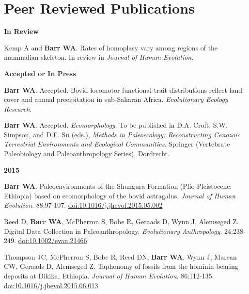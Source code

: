 \documentclass{article}
\begin{document}
\section*{Peer Reviewed Publications}


\begin{description*}
\item[] {\bfseries In Review}
\item[] Kemp A and {\bfseries Barr WA}. Rates of homoplasy vary among regions of the mammalian skeleton. In review in \emph{Journal of Human Evolution.} 
\end{description*}

\begin{description*}
\item[] {\bfseries Accepted or In Press}
\item[] {\bfseries Barr WA}. Accepted. Bovid locomotor functional trait distributions reflect land cover and annual precipitation in sub-Saharan Africa. \emph{Evolutionary Ecology Research}.
\item[] {\bfseries Barr WA}. Accepted.  \emph{Ecomorphology}. To be published in D.A. Croft, S.W. Simpson, and D.F. Su (eds.),  \emph{Methods in Paleoecology: Reconstructing Cenozoic Terrestrial Environments and Ecological Communities}. Springer (Vertebrate Paleobiology and Paleoanthropology Series), Dordrecht.
\end{description*}

\begin{description*}
\item[] {\bfseries 2015}
\item[] {\bfseries Barr WA}. Paleoenvironments of the Shungura Formation (Plio-Pleistocene: Ethiopia) based on ecomorphology of the bovid astragalus. \emph{Journal of Human Evolution}. 88:97-107. \href{http://dx.doi.org/10.1016/j.jhevol.2015.05.002}{doi:10.1016/j.jhevol.2015.05.002}
\item Reed D, {\bfseries Barr WA}, McPherron S, Bobe R, Geraads D, Wynn J, Alemseged Z. Digital Data Collection in Paleoanthropology. \emph{Evolutionary Anthropology}. 24:238-249. \href{http://dx.doi.org/10.1002/evan.21466}{doi:10.1002/evan.21466}
\item[] Thompson JC, McPherron S, Bobe R, Reed DN, {\bfseries Barr WA}, Wynn J, Marean CW, Geraads D, Alemseged Z. Taphonomy of fossils from the hominin-bearing deposits at Dikika, Ethiopia. \emph{Journal of Human Evolution}. 86:112-135. \href{http://dx.doi.org/10.1016/j.jhevol.2015.06.013}{doi:10.1016/j.jhevol.2015.06.013}


\end{description*}
\end{document}
